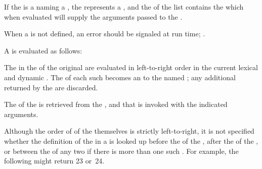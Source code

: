 \endsubsubsubsubsection%


If the  is a  naming a ,
the  represents a ,
and the  of the list contains the  
which when evaluated will supply the arguments passed to the .

When a  is not defined, 
an error  should be signaled at run time;
\seesection\SemanticConstraints.

A  is evaluated as follows:

The  in the  of the original 
are evaluated in left-to-right order in the current lexical and 
dynamic .  The  of each
such  becomes an  to the named ;
any additional  returned by the  are discarded.

The  of the  
is retrieved from the ,
and that  is invoked with the indicated arguments.


Although the order of  of 
the   themselves is 
strictly left-to-right, it is not specified whether 
the definition of the  in a  is looked up 
before the  of the  ,
after the  of the  ,
or between the  of any two   
if there is more than one such  .  
For example, the following might return 23 or~24.

